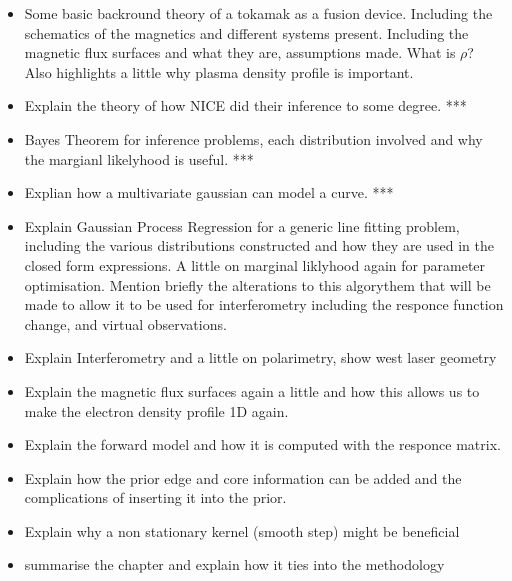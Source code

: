 \begin{itemize}
    \item Some basic backround theory of a tokamak as a fusion device. Including the schematics of the magnetics and different systems present. Including the magnetic flux surfaces and what they are, assumptions made. What is $\rho$? Also highlights a little why plasma density profile is important. 
    \item Explain the theory of how NICE did their inference to some degree. ***
    \item Bayes Theorem for inference problems, each distribution involved and why the margianl likelyhood is useful. ***
    \item Explian how a multivariate gaussian can model a curve. ***
    \item Explain Gaussian Process Regression for a generic line fitting problem, including the various distributions constructed and how they are used in the closed form expressions. A little on marginal liklyhood again for parameter optimisation. Mention briefly the alterations to this algorythem that will be made to allow it to be used for interferometry including the responce function change, and virtual observations.
    \item Explain Interferometry and a little on polarimetry, show west laser geometry
    \item Explain the magnetic flux surfaces again a little and how this allows us to make the electron density profile 1D again.
    \item Explain the forward model and how it is computed with the responce matrix.
    \item Explain how the prior edge and core information can be added and the complications of inserting it into the prior.
    \item Explain why a non stationary kernel (smooth step) might be beneficial 
    \item summarise the chapter and explain how it ties into the methodology
\end{itemize}





